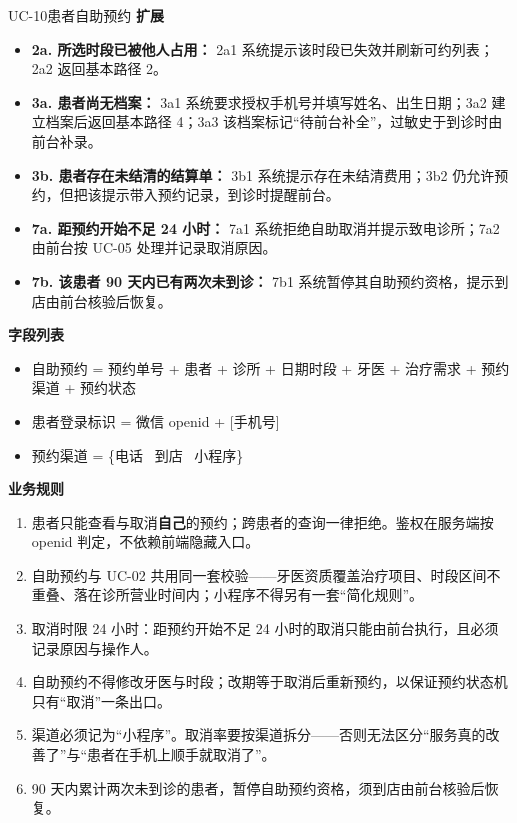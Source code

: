 \documentclass[11pt,a4paper]{ctexart}
\begin{document}
\begin{ucbox}{UC-10\quad 患者自助预约}
\vspace{2pt}
\textbf{扩展}
\begin{itemize}[leftmargin=1.4em,topsep=2pt,itemsep=1pt]
  \item \textbf{2a. 所选时段已被他人占用：} 2a1 系统提示该时段已失效并刷新可约列表；2a2 返回基本路径 2。
  \item \textbf{3a. 患者尚无档案：} 3a1 系统要求授权手机号并填写姓名、出生日期；3a2 建立档案后返回基本路径 4；3a3 该档案标记“待前台补全”，过敏史于到诊时由前台补录。
  \item \textbf{3b. 患者存在未结清的结算单：} 3b1 系统提示存在未结清费用；3b2 仍允许预约，但把该提示带入预约记录，到诊时提醒前台。
  \item \textbf{7a. 距预约开始不足 24 小时：} 7a1 系统拒绝自助取消并提示致电诊所；7a2 由前台按 UC-05 处理并记录取消原因。
  \item \textbf{7b. 该患者 90 天内已有两次未到诊：} 7b1 系统暂停其自助预约资格，提示到店由前台核验后恢复。
\end{itemize}

\vspace{2pt}
\textbf{字段列表}
\begin{itemize}[leftmargin=1.4em,topsep=2pt,itemsep=1pt]
  \item 自助预约 = 预约单号 + 患者 + 诊所 + 日期时段 + 牙医 + 治疗需求 + 预约渠道 + 预约状态
  \item 患者登录标识 = 微信 openid + [手机号]
  \item 预约渠道 = \{电话 \textbar\ 到店 \textbar\ 小程序\}
\end{itemize}

\vspace{2pt}
\textbf{业务规则}
\begin{enumerate}[leftmargin=1.9em,topsep=2pt,itemsep=1pt]
  \item 患者只能查看与取消\textbf{自己}的预约；跨患者的查询一律拒绝。鉴权在服务端按 openid 判定，不依赖前端隐藏入口。
  \item 自助预约与 UC-02 共用同一套校验——牙医资质覆盖治疗项目、时段区间不重叠、落在诊所营业时间内；小程序不得另有一套“简化规则”。
  \item 取消时限 24 小时：距预约开始不足 24 小时的取消只能由前台执行，且必须记录原因与操作人。
  \item 自助预约不得修改牙医与时段；改期等于取消后重新预约，以保证预约状态机只有“取消”一条出口。
  \item 渠道必须记为“小程序”。取消率要按渠道拆分——否则无法区分“服务真的改善了”与“患者在手机上顺手就取消了”。
  \item 90 天内累计两次未到诊的患者，暂停自助预约资格，须到店由前台核验后恢复。
\end{enumerate}


\end{ucbox}
\end{document}
